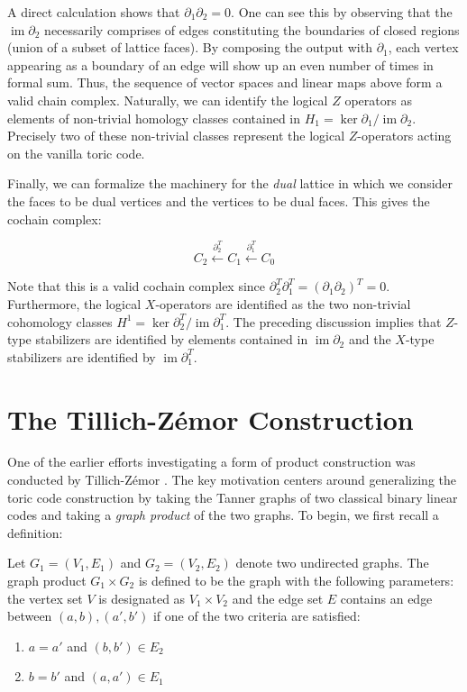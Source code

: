 \documentclass[12pt]{article}%
\DeclareMathOperator{\im}{im}
\theoremstyle{definition}
\begin{document}
A direct calculation shows that $\partial_1\partial_2 = 0$. One can see this by observing that the $\im \partial_2$ necessarily comprises of edges constituting the boundaries of closed regions (union of a subset of lattice faces). By composing the output with $\partial_1$, each vertex appearing as a boundary of an edge will show up an even number of times in formal sum. Thus, the sequence of vector spaces and linear maps above form a valid chain complex. Naturally, we can identify the logical $Z$ operators as elements of non-trivial homology classes contained in $H_1 = \ker \partial_1 / \im \partial_2$. Precisely two of these non-trivial classes represent the logical $Z$-operators acting on the vanilla toric code. 

Finally, we can formalize the machinery for the \emph{dual} lattice in which we consider the faces to be dual vertices and the vertices to be dual faces. This gives the cochain complex:

\[ C_2 \xleftarrow{\partial_2^T} C_1 \xleftarrow{\partial_1^T} C_0  \]

\noindent Note that this is a valid cochain complex since $\partial_2^T\partial_1^T = (\partial_1\partial_2)^T = 0$. Furthermore, the logical $X$-operators are identified as the two non-trivial cohomology classes $H^1 = \ker \partial_2^T / \im \partial_1^T$.  The preceding discussion implies that $Z$-type stabilizers are identified by elements contained in $\im \partial_2$ and the $X$-type stabilizers are identified by $\im \partial_1^T$.



\section{The Tillich-Z\'emor Construction}
One of the earlier efforts investigating a form of product construction was conducted by Tillich-Z\'emor \cite{tillich2013quantum}. The key motivation centers around generalizing the toric code construction by taking the Tanner graphs of two classical binary linear codes and taking a \emph{graph product} of the two graphs. To begin, we first recall a definition:


\vspace{5pt}
\begin{definition}
Let $G_1 = (V_1, E_1)$ and $G_2 = (V_2,E_2)$ denote two undirected graphs. The graph product $G_1 \times G_2$ is defined to be the graph with the following parameters: the vertex set $V$ is designated as $V_1 \times V_2$ and the edge set $E$ contains an edge between $(a,b), (a',b')$ if one of the two criteria are satisfied:

\begin{enumerate}
  \item $a = a'$ and $(b,b') \in E_2$
  \item $b = b'$ and $(a,a') \in E_1$
\end{enumerate}
\end{definition}
\vspace{5pt}
\end{document}
